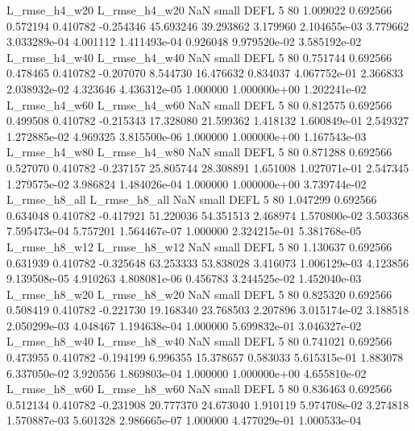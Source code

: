  L_rmse_h4_w20  L_rmse_h4_w20                   NaN      small     DEFL                 5 80 1.009022       0.692566 0.572194       0.410782   -0.254346     45.693246     39.293862     3.179960   2.104655e-03  3.779662 3.033289e-04     4.001112   1.411493e-04            0.926048    9.979520e-02        3.585192e-02
 L_rmse_h4_w40  L_rmse_h4_w40                   NaN      small     DEFL                 5 80 0.751744       0.692566 0.478465       0.410782   -0.207070      8.544730     16.476632     0.834037   4.067752e-01  2.366833 2.038932e-02     4.323646   4.436312e-05            1.000000    1.000000e+00        1.202241e-02
 L_rmse_h4_w60  L_rmse_h4_w60                   NaN      small     DEFL                 5 80 0.812575       0.692566 0.499508       0.410782   -0.215343     17.328080     21.599362     1.418132   1.600849e-01  2.549327 1.272885e-02     4.969325   3.815500e-06            1.000000    1.000000e+00        1.167543e-03
 L_rmse_h4_w80  L_rmse_h4_w80                   NaN      small     DEFL                 5 80 0.871288       0.692566 0.527070       0.410782   -0.237157     25.805744     28.308891     1.651008   1.027071e-01  2.547345 1.279575e-02     3.986824   1.484026e-04            1.000000    1.000000e+00        3.739744e-02
 L_rmse_h8_all  L_rmse_h8_all                   NaN      small     DEFL                 5 80 1.047299       0.692566 0.634048       0.410782   -0.417921     51.220036     54.351513     2.468974   1.570800e-02  3.503368 7.595473e-04     5.757201   1.564467e-07            1.000000    2.324215e-01        5.381768e-05
 L_rmse_h8_w12  L_rmse_h8_w12                   NaN      small     DEFL                 5 80 1.130637       0.692566 0.631939       0.410782   -0.325648     63.253333     53.838028     3.416073   1.006129e-03  4.123856 9.139508e-05     4.910263   4.808081e-06            0.456783    3.244525e-02        1.452040e-03
 L_rmse_h8_w20  L_rmse_h8_w20                   NaN      small     DEFL                 5 80 0.825320       0.692566 0.508419       0.410782   -0.221730     19.168340     23.768503     2.207896   3.015174e-02  3.188518 2.050299e-03     4.048467   1.194638e-04            1.000000    5.699832e-01        3.046327e-02
 L_rmse_h8_w40  L_rmse_h8_w40                   NaN      small     DEFL                 5 80 0.741021       0.692566 0.473955       0.410782   -0.194199      6.996355     15.378657     0.583033   5.615315e-01  1.883078 6.337050e-02     3.920556   1.869803e-04            1.000000    1.000000e+00        4.655810e-02
 L_rmse_h8_w60  L_rmse_h8_w60                   NaN      small     DEFL                 5 80 0.836463       0.692566 0.512134       0.410782   -0.231908     20.777370     24.673040     1.910119   5.974708e-02  3.274818 1.570887e-03     5.601328   2.986665e-07            1.000000    4.477029e-01        1.000533e-04
